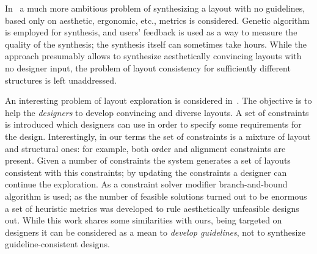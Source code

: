 In~\cite{Grid} a much more ambitious problem of synthesizing a layout with no guidelines, based only on aesthetic, ergonomic, etc., metrics is considered.
Genetic algorithm is employed for synthesis, and users' feedback is used as a way to measure the quality of the synthesis; the synthesis itself can
sometimes take hours. While the approach presumably allows to synthesize aesthetically convincing layouts with no designer input, the problem of
layout consistency for sufficiently different structures is left unaddressed.

An interesting problem of layout exploration is considered in~\cite{Scout}. The objective is to help the \emph{designers} to develop convincing and
diverse layouts. A set of constraints is introduced which designers can use in order to specify some requirements for the design. Interestingly, in our terms the
set of constraints is a mixture of layout and structural ones: for example, both order and alignment constraints are present. Given
a number of constraints the system generates a set of layouts consistent with this constraints; by updating the constraints a designer can
continue the exploration. As a constraint solver modifier branch-and-bound algorithm is used; as the number of feasible solutions
turned out to be enormous a set of heuristic metrics was developed to rule aesthetically unfeasible designs out. While this work
shares some similarities with ours, being targeted on designers it can be considered as a mean to \emph{develop guidelines}, not to synthesize
guideline-consistent designs.
